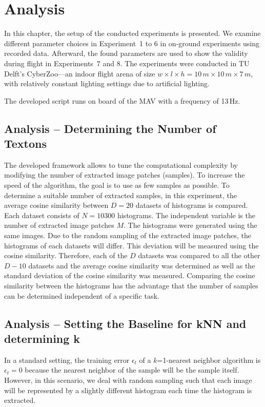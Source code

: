 \chapter{Analysis}
\label{chap:analysis}

In this chapter, the setup of the conducted experiments is
presented. We examine different parameter choices in Experiment~1 to 6
in on-ground experiments using recorded data. Afterward, the found
parameters are used to show the validity during flight in
Experiments~7 and 8. The experiments were conducted in TU Delft's
CyberZoo---an indoor flight arena of size $w \times l \times h = 10\,m
\times10\,m \times 7\,m$, with relatively constant lighting settings
due to artificial lighting.

The developed script runs on board of the MAV with a
frequency of 13\,Hz.

\section{Analysis -- Determining the Number of Textons}
\label{sec:numtextons}

The developed framework allows to tune the computational complexity by
modifying the number of extracted image patches (samples). To increase
the speed of the algorithm, the goal is to use as few samples as
possible. To determine a suitable number of extracted samples, in this
experiment, the average cosine similarity between $D = 20$ datasets of
histograms is compared. Each dataset consists of $N = 10300$
histograms. The independent variable is the number of extracted image
patches $M$. The histograms were generated using the same images. Due
to the random sampling of the extracted image patches, the histograms
of each datasets will differ. This deviation will be measured using
the cosine similarity. Therefore, each of the $D$ datasets was
compared to all the other $D - 10$ datasets and the average cosine
similarity was determined as well as the standard deviation of the
cosine similarity was measured. Comparing the cosine similarity
between the histograms has the advantage that the number of samples
can be determined independent of a specific task.

\section{Analysis -- Setting the Baseline for kNN and determining k}
\label{sec:numtextons}

In a standard setting, the training error $\epsilon_t$ of a
$k$=1-nearest neighbor algorithm is $\epsilon_t = 0$ because the
nearest neighbor of the sample will be the sample itself. However, in
this scenario, we deal with random sampling such that each image will
be represented by a slightly different histogram each time the
histogram is extracted.

